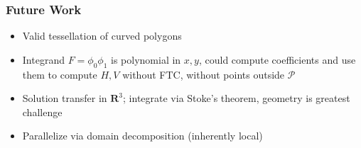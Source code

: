 \documentclass{beamer}
\begin{document}
\begin{frame}
\frametitle{Future Work}
\begin{itemize}
\pause
\item Valid tessellation of curved polygons
\pause
\item Integrand \(F = \phi_0 \phi_1\) is polynomial in \(x, y\), could
  compute coefficients and use them to compute \(H, V\) without
  FTC, without points outside \(\mathcal{P}\)
\pause
\item Solution transfer in \(\mathbf{R}^3\); integrate via Stoke's theorem,
  geometry is greatest challenge
\pause
\item Parallelize via domain decomposition (inherently local)
\end{itemize}
\end{frame}
\end{document}
